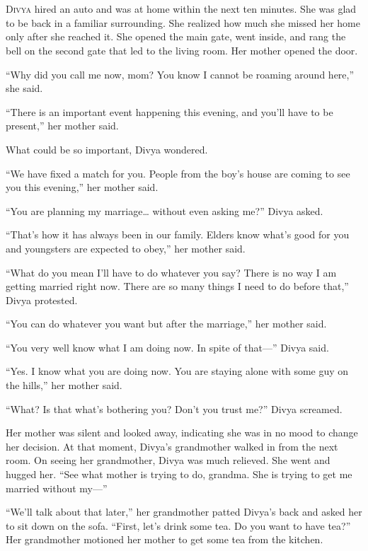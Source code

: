 \chapter{}

\lettrine{D}{ivya} hired an auto and was at home within the next ten minutes.
She was glad to be back in a familiar surrounding. She realized how much she
missed her home only after she reached it. She opened the main gate, went
inside, and rang the bell on the second gate that led to the living room. Her
mother opened the door.

“Why did you call me now, mom? You know I cannot be roaming around here,” she
said.

“There is an important event happening this evening, and you'll have to be
present,” her mother said.

What could be so important, Divya wondered.

“We have fixed a match for you. People from the boy's house are coming to see
you this evening,” her mother said.

“You are planning my marriage… without even asking me?” Divya asked.

“That's how it has always been in our family. Elders know what's good for you
and youngsters are expected to obey,” her mother said.

“What do you mean I'll have to do whatever you say? There is no way I am getting
married right now. There are so many things I need to do before that,” Divya
protested.

“You can do whatever you want but after the marriage,” her mother said.

“You very well know what I am doing now. In spite of that—” Divya said.

“Yes. I know what you are doing now. You are staying alone with some guy on the
hills,” her mother said.

“What? Is that what's bothering you? Don't you trust me?” Divya screamed.

Her mother was silent and looked away, indicating she was in no mood to change
her decision. At that moment, Divya's grandmother walked in from the next room.
On seeing her grandmother, Divya was much relieved. She went and hugged her. “See
what mother is trying to do, grandma. She is trying to get me married without
my—”

“We'll talk about that later,” her grandmother patted Divya's back and asked her
to sit down on the sofa. “First, let's drink some tea. Do you want to
have tea?” Her grandmother motioned her mother to get some tea from the kitchen.

